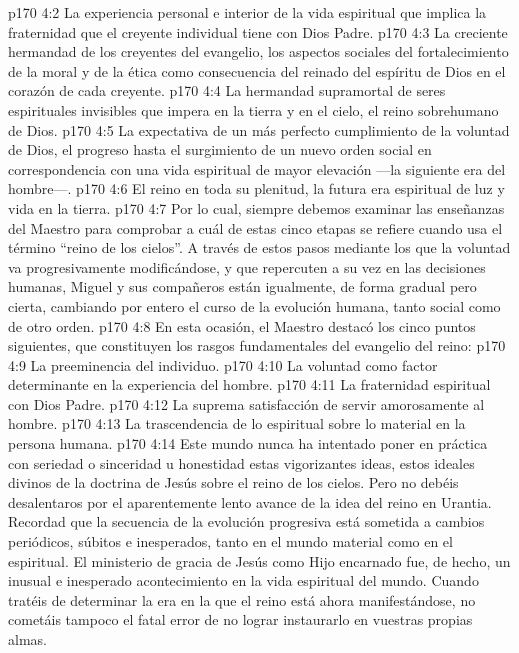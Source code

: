 \vs p170 4:2 La experiencia personal e interior de la vida espiritual que implica la fraternidad que el creyente individual tiene con Dios Padre.
\vs p170 4:3 La creciente hermandad de los creyentes del evangelio, los aspectos sociales del fortalecimiento de la moral y de la ética como consecuencia del reinado del espíritu de Dios en el corazón de cada creyente.
\vs p170 4:4 La hermandad supramortal de seres espirituales invisibles que impera en la tierra y en el cielo, el reino sobrehumano de Dios.
\vs p170 4:5 La expectativa de un más perfecto cumplimiento de la voluntad de Dios, el progreso hasta el surgimiento de un nuevo orden social en correspondencia con una vida espiritual de mayor elevación ---la siguiente era del hombre---.
\vs p170 4:6 El reino en toda su plenitud, la futura era espiritual de luz y vida en la tierra.
\vs p170 4:7 \pc Por lo cual, siempre debemos examinar las enseñanzas del Maestro para comprobar a cuál de estas cinco etapas se refiere cuando usa el término “reino de los cielos”. A través de estos pasos mediante los que la voluntad va progresivamente modificándose, y que repercuten a su vez en las decisiones humanas, Miguel y sus compañeros están igualmente, de forma gradual pero cierta, cambiando por entero el curso de la evolución humana, tanto social como de otro orden.
\vs p170 4:8 En esta ocasión, el Maestro destacó los cinco puntos siguientes, que constituyen los rasgos fundamentales del evangelio del reino:
\vs p170 4:9 La preeminencia del individuo.
\vs p170 4:10 La voluntad como factor determinante en la experiencia del hombre.
\vs p170 4:11 La fraternidad espiritual con Dios Padre.
\vs p170 4:12 La suprema satisfacción de servir amorosamente al hombre.
\vs p170 4:13 La trascendencia de lo espiritual sobre lo material en la persona humana.
\vs p170 4:14 \pc Este mundo nunca ha intentado poner en práctica con seriedad o sinceridad u honestidad estas vigorizantes ideas, estos ideales divinos de la doctrina de Jesús sobre el reino de los cielos. Pero no debéis desalentaros por el aparentemente lento avance de la idea del reino en Urantia. Recordad que la secuencia de la evolución progresiva está sometida a cambios periódicos, súbitos e inesperados, tanto en el mundo material como en el espiritual. El ministerio de gracia de Jesús como Hijo encarnado fue, de hecho, un inusual e inesperado acontecimiento en la vida espiritual del mundo. Cuando tratéis de determinar la era en la que el reino está ahora manifestándose, no cometáis tampoco el fatal error de no lograr instaurarlo en vuestras propias almas.
